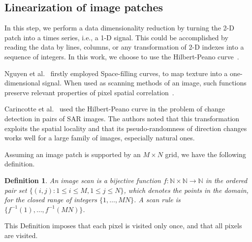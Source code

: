 \documentclass[journal]{IEEEtran}
\begin{document}
\subsection{Linearization of image patches}\label{linearization}

In this step, we perform a data dimensionality reduction by turning the 2-D patch into a times series, i.e., a 1-D signal.
This could be accomplished by reading the data by lines, columns, or any transformation of 2-D indexes into a sequence of integers.
In this work, we choose to use the Hilbert-Peano curve~\cite{Lee1994Texture}.

Nguyen et al.~\cite{nguyen1982space} firstly employed Space-filling curves, to map texture into a one-dimensional signal.
When used as scanning methods of an image, such functions preserve relevant properties of pixel spatial correlation~\cite{Lee1994Texture}.

Carincotte et al.~\cite{Carincotte2006changeDetection} used the Hilbert-Peano curve in the problem of change detection in pairs of SAR images.
The authors noted that this transformation exploits the spatial locality and that its pseudo-randomness
of direction changes works well for a large family of images, especially
natural ones.

Assuming an image patch is supported by an $M \times N$ grid, we have the following definition.

\newtheorem{mydef}{Definition}
\begin{mydef}
	An image scan is a bijective function $f \colon \mathbb{N} \times \mathbb{N} \to \mathbb{N}$ in the ordered pair set $ \{(i, j): 1 \leq i \leq M , 1 \leq j \leq N\}$, which denotes the points in the domain, for the closed range of integers $\{1, \dots, M  N\}$.
	A scan rule is $\{f^{-1}(1), \dots, f^{-1}(M  N)\}$.
	\label{def:CurveFilling}
\end{mydef}
This Definition imposes that each pixel is visited only once, and that all pixels are visited.
\end{document}
